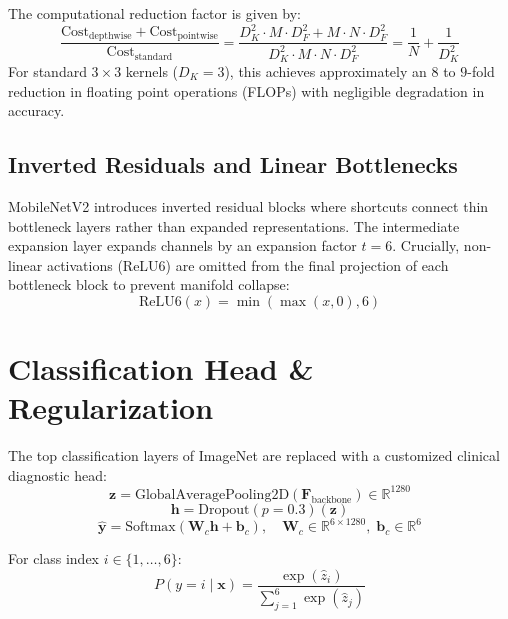 \documentclass[12pt,a4paper]{report}
\begin{document}
The computational reduction factor is given by:
\begin{equation}
    \frac{\text{Cost}_{\text{depthwise}} + \text{Cost}_{\text{pointwise}}}{\text{Cost}_{\text{standard}}} = \frac{D_K^2 \cdot M \cdot D_F^2 + M \cdot N \cdot D_F^2}{D_K^2 \cdot M \cdot N \cdot D_F^2} = \frac{1}{N} + \frac{1}{D_K^2}
\end{equation}
For standard $3 \times 3$ kernels ($D_K = 3$), this achieves approximately an $8$ to $9$-fold reduction in floating point operations (FLOPs) with negligible degradation in accuracy.

\subsection{Inverted Residuals and Linear Bottlenecks}
MobileNetV2 introduces inverted residual blocks where shortcuts connect thin bottleneck layers rather than expanded representations. The intermediate expansion layer expands channels by an expansion factor $t=6$. Crucially, non-linear activations (ReLU6) are omitted from the final projection of each bottleneck block to prevent manifold collapse:
\begin{equation}
    \text{ReLU6}(x) = \min(\max(x, 0), 6)
\end{equation}

\section{Classification Head \& Regularization}
The top classification layers of ImageNet are replaced with a customized clinical diagnostic head:
\begin{equation}
    \mathbf{z} = \text{GlobalAveragePooling2D}(\mathbf{F}_{\text{backbone}}) \in \mathbb{R}^{1280}
\end{equation}
\begin{equation}
    \mathbf{h} = \text{Dropout}(p = 0.3)(\mathbf{z})
\end{equation}
\begin{equation}
    \hat{\mathbf{y}} = \text{Softmax}(\mathbf{W}_c \mathbf{h} + \mathbf{b}_c), \quad \mathbf{W}_c \in \mathbb{R}^{6 \times 1280}, \; \mathbf{b}_c \in \mathbb{R}^6
\end{equation}

For class index $i \in \{1, \dots, 6\}$:
\begin{equation}
    P(y = i \mid \mathbf{x}) = \frac{\exp(\hat{z}_i)}{\sum_{j=1}^6 \exp(\hat{z}_j)}
\end{equation}
\end{document}

